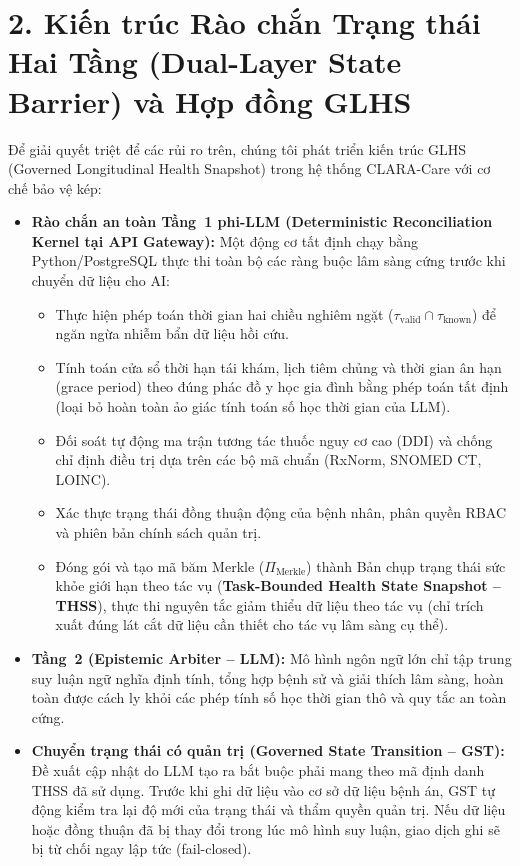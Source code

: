 \documentclass[11pt]{article}
\begin{document}
\section*{2. Kiến trúc Rào chắn Trạng thái Hai Tầng (Dual-Layer State Barrier) và Hợp đồng GLHS}
Để giải quyết triệt để các rủi ro trên, chúng tôi phát triển kiến trúc GLHS (Governed Longitudinal Health Snapshot) trong hệ thống CLARA-Care với cơ chế bảo vệ kép:

\begin{itemize}[leftmargin=1.8em]
\item \textbf{Rào chắn an toàn Tầng~1 phi-LLM (Deterministic Reconciliation Kernel tại API Gateway):} Một động cơ tất định chạy bằng Python/PostgreSQL thực thi toàn bộ các ràng buộc lâm sàng cứng trước khi chuyển dữ liệu cho AI:
\begin{itemize}
  \item Thực hiện phép toán thời gian hai chiều nghiêm ngặt ($\tau_{\text{valid}} \cap \tau_{\text{known}}$) để ngăn ngừa nhiễm bẩn dữ liệu hồi cứu.
  \item Tính toán cửa sổ thời hạn tái khám, lịch tiêm chủng và thời gian ân hạn (grace period) theo đúng phác đồ y học gia đình bằng phép toán tất định (loại bỏ hoàn toàn ảo giác tính toán số học thời gian của LLM).
  \item Đối soát tự động ma trận tương tác thuốc nguy cơ cao (DDI) và chống chỉ định điều trị dựa trên các bộ mã chuẩn (RxNorm, SNOMED CT, LOINC).
  \item Xác thực trạng thái đồng thuận động của bệnh nhân, phân quyền RBAC và phiên bản chính sách quản trị.
  \item Đóng gói và tạo mã băm Merkle ($\Pi_{\text{Merkle}}$) thành Bản chụp trạng thái sức khỏe giới hạn theo tác vụ (\textbf{Task-Bounded Health State Snapshot -- THSS}), thực thi nguyên tắc giảm thiểu dữ liệu theo tác vụ (chỉ trích xuất đúng lát cắt dữ liệu cần thiết cho tác vụ lâm sàng cụ thể).
\end{itemize}
\item \textbf{Tầng~2 (Epistemic Arbiter -- LLM):} Mô hình ngôn ngữ lớn chỉ tập trung suy luận ngữ nghĩa định tính, tổng hợp bệnh sử và giải thích lâm sàng, hoàn toàn được cách ly khỏi các phép tính số học thời gian thô và quy tắc an toàn cứng.
\item \textbf{Chuyển trạng thái có quản trị (Governed State Transition -- GST):} Đề xuất cập nhật do LLM tạo ra bắt buộc phải mang theo mã định danh THSS đã sử dụng. Trước khi ghi dữ liệu vào cơ sở dữ liệu bệnh án, GST tự động kiểm tra lại độ mới của trạng thái và thẩm quyền quản trị. Nếu dữ liệu hoặc đồng thuận đã bị thay đổi trong lúc mô hình suy luận, giao dịch ghi sẽ bị từ chối ngay lập tức (fail-closed).
\end{itemize}
\end{document}
